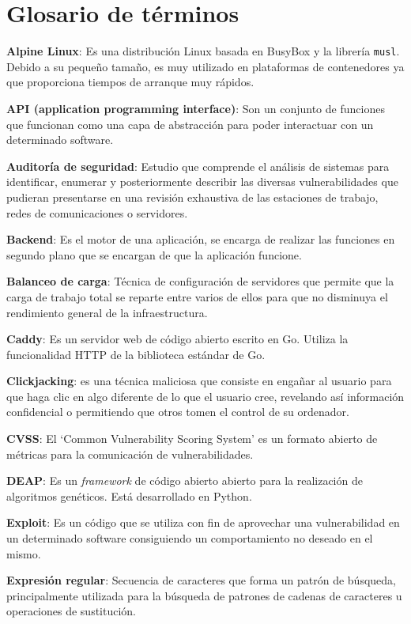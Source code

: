 \chapter{Glosario de términos}

\textbf{Alpine Linux}: Es una distribución Linux basada en BusyBox y la librería \texttt{musl}. Debido a su pequeño tamaño, es muy utilizado en plataformas de contenedores ya que proporciona tiempos de arranque muy rápidos.
\bigskip

\textbf{API (application programming interface)}: Son un conjunto de funciones que funcionan como una capa de abstracción para poder interactuar con un determinado software.
\bigskip

\textbf{Auditoría de seguridad}: Estudio que comprende el análisis de sistemas para identificar, enumerar y posteriormente describir las diversas vulnerabilidades que pudieran presentarse en una revisión exhaustiva de las estaciones de trabajo, redes de comunicaciones o servidores.
\bigskip

\textbf{Backend}: Es el motor de una aplicación, se encarga de realizar las funciones en segundo plano que se encargan de que la aplicación funcione.
\bigskip

\textbf{Balanceo de carga}: Técnica de configuración de servidores que permite que la carga de trabajo total se reparte entre varios de ellos para que no disminuya el rendimiento general de la infraestructura.
\bigskip

\textbf{Caddy}: Es un servidor web de código abierto escrito en Go. Utiliza la funcionalidad HTTP de la biblioteca estándar de Go.
\bigskip

\textbf{Clickjacking}: es una técnica maliciosa que consiste en engañar al usuario para que haga clic en algo diferente de lo que el usuario cree, revelando así información confidencial o permitiendo que otros tomen el control de su ordenador.
\bigskip

\textbf{CVSS}: El `Common Vulnerability Scoring System' es un formato abierto de métricas para la comunicación de vulnerabilidades.
\bigskip

\textbf{DEAP}: Es un \textit{framework} de código abierto abierto para la realización de algoritmos genéticos. Está desarrollado en Python.
\bigskip

\textbf{Exploit}: Es un código que se utiliza con fin de aprovechar una vulnerabilidad en un determinado software consiguiendo un comportamiento no deseado en el mismo.
\bigskip

\textbf{Expresión regular}: Secuencia de caracteres que forma un patrón de búsqueda, principalmente utilizada para la búsqueda de patrones de cadenas de caracteres u operaciones de sustitución.
\bigskip

